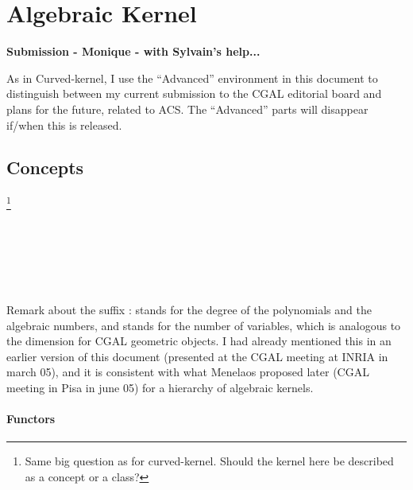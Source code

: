 \chapter{Algebraic Kernel}

\textbf{Submission - Monique - with Sylvain's help...}

\begin{ccAdvanced}
As in Curved-kernel, I use the ``Advanced'' environment in this
document to distinguish between my current submission to the CGAL
editorial board and plans for the future, related to ACS. The
``Advanced'' parts will disappear if/when this is released.
\end{ccAdvanced}

\section*{Concepts}

\footnote{Same big question as for curved-kernel. Should the kernel here
be described as a concept or a class?}

\\
\\

\begin{ccAdvanced}
\\
\\
\end{ccAdvanced}

\begin{ccAdvanced}
Remark about the suffix :  stands 
for the degree of the polynomials and the algebraic numbers, and
 stands for the number of variables, which is analogous to the
dimension for CGAL geometric objects. I had already mentioned this in an
earlier version of this document (presented at the CGAL meeting at
INRIA in march 05), and it is consistent with what Menelaos proposed
later (CGAL meeting in Pisa in june 05) for a hierarchy of algebraic kernels.
\end{ccAdvanced}

	\subsubsection*{Functors} 

